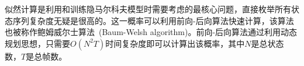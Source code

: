 似然计算是利用和训练隐马尔科夫模型时需要考虑的最核心问题，直接枚举所有状态序列复杂度无疑是很高的。这一概率可以利用前向-后向算法快速计算，该算法也被称作鲍姆威尔士算法~\cite{baum1967inequality}(Baum-Welsh algorithm)。前向-后向算法通过利用动态规划思想，只需要$O(N^2T)$时间复杂度即可以计算出该概率，其中$N$是总状态数，$T$是总帧数。

%


